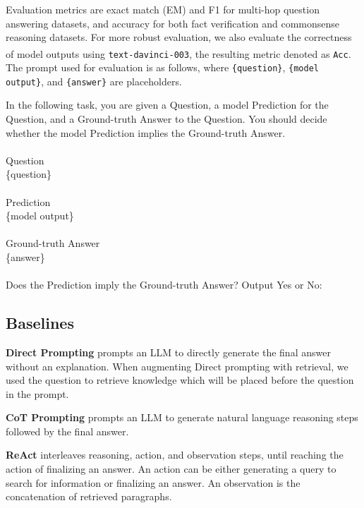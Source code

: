 \documentclass[11pt]{article}
\begin{document}
Evaluation metrics are exact match (EM) and F1 for multi-hop question answering datasets, and accuracy for both fact verification and commonsense reasoning datasets.
For more robust evaluation, we also evaluate the correctness of model outputs using \texttt{text-davinci-003}, the resulting metric denoted as \texttt{Acc\textsuperscript{\dag}}.
The prompt used for evaluation is as follows, where \texttt{\{question\}}, \texttt{\{model output\}}, and \texttt{\{answer\}} are placeholders.
\begin{tcolorbox}[colback=black!1!white,colframe=black!57!white,title=Prompt for Evaluating the Correctness of a Model Output]
In the following task, you are given a Question, a model Prediction for the Question, and a Ground-truth Answer to the Question. You should decide whether the model Prediction implies the Ground-truth Answer.\\
\\
Question\\
\{question\}\\
\\
Prediction\\
\{model output\}\\
\\
Ground-truth Answer\\
\{answer\}\\
\\
Does the Prediction imply the Ground-truth Answer? Output Yes or No:
\end{tcolorbox}

\subsection{Baselines}

\noindent
\textbf{Direct Prompting} \cite{DBLP:journals/corr/abs-2005-14165} prompts an LLM to directly generate the final answer without an explanation.
When augmenting Direct prompting with retrieval, we used the question to retrieve knowledge which will be placed before the question in the prompt.

\noindent
\textbf{CoT Prompting} \cite{DBLP:journals/corr/abs-2201-11903} prompts an LLM to generate natural language reasoning steps followed by the final answer.

\noindent
\textbf{ReAct} \cite{DBLP:journals/corr/abs-2210-03629} interleaves reasoning, action, and observation steps, until reaching the action of finalizing an answer.
An action can be either generating a query to search for information or finalizing an answer.
An observation is the concatenation of retrieved paragraphs.
\end{document}

